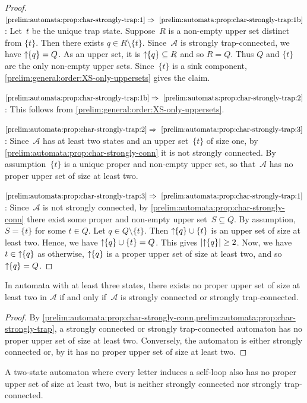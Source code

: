 \begin{proof}
	$\ref{prelim:automata:prop:char-strongly-trap:1} \Rightarrow~\ref{prelim:automata:prop:char-strongly-trap:1b}$:
	Let~$t$ be the unique trap state.
	Suppose~$R$ is a non-empty upper set distinct from $\{t\}$.
	Then there exists $q \in R \setminus\{t\}$.
	Since~$\mathcal A$ is strongly trap-connected,
	we have $\mbox{\ensuremath{\displaystyle \uparrow \!\!\{q\}}} = Q$. As an upper set, 
	it is $\mbox{\ensuremath{\displaystyle \uparrow \!\!\{q\}}}\subseteq R$
	and so $R = Q$. Thus $Q$ and $\{t\}$ are the only non-empty upper sets.
	Since~$\{t\}$ is a sink component, \cref{prelim:general:order:XS-only-uppersets} 
	gives the claim.	
	
	$\ref{prelim:automata:prop:char-strongly-trap:1b} \Rightarrow~\ref{prelim:automata:prop:char-strongly-trap:2}$:
	This follows from \cref{prelim:general:order:XS-only-uppersets}.
	
	$\ref{prelim:automata:prop:char-strongly-trap:2} \Rightarrow~\ref{prelim:automata:prop:char-strongly-trap:3}$: Since~$\mathcal A$ has at least two states
	and an upper set~$\{t\}$ of size one, by \cref{prelim:automata:prop:char-strongly-conn}
	it is not strongly connected. By assumption~$\{t\}$
	is a unique proper and non-empty upper set, so that~$\mathcal A$
	has no proper upper set of size at least two.
	
	$\ref{prelim:automata:prop:char-strongly-trap:3} \Rightarrow~\ref{prelim:automata:prop:char-strongly-trap:1}$: Since~$\mathcal A$
	is not strongly connected, by \cref{prelim:automata:prop:char-strongly-conn}
	there exist some proper and non-empty upper set~$S \subseteq Q$.
	By assumption, $S = \{t\}$ for some $t \in Q$.
	Let $q \in Q \setminus\{t\}$.
	Then $\mbox{\ensuremath{\displaystyle \uparrow \!\!\{q\}}} \cup \{t\}$ is an upper set
	of size at least two. Hence, we have $\mbox{\ensuremath{\displaystyle \uparrow \!\!\{q\}}} \cup \{t\} = Q$.
	This gives $|\mbox{\ensuremath{\displaystyle \uparrow \!\!\{q\}}}| \ge 2$. Now, we have $t \in \mbox{\ensuremath{\displaystyle \uparrow \!\!\{q\}}}$
	as otherwise, $\mbox{\ensuremath{\displaystyle \uparrow \!\!\{q\}}}$
	is a proper upper set of size at least two,
	and so $\mbox{\ensuremath{\displaystyle \uparrow \!\!\{q\}}} = Q$.
\end{proof}

\begin{corollary}
	\label{prelim:fact:no-proper-upper-sets-size-two}
	In automata with at least three states, there exists no proper upper set of size at least two in $\mathcal A$
	if and only if~$\mathcal A$ is strongly connected
	or strongly trap-connected.	  
\end{corollary}
\begin{proof}
	By \cref{prelim:automata:prop:char-strongly-conn,prelim:automata:prop:char-strongly-trap},
	a strongly connected or strongly trap-connected
	automaton has no proper upper set of size at least two.
	Conversely, the automaton is either strongly connected
	or, by 
	it has no proper upper set of size at least two.
\end{proof}

A two-state automaton where every letter induces a self-loop
also has no proper upper set of size at least two, but is neither strongly connected
nor strongly trap-connected.